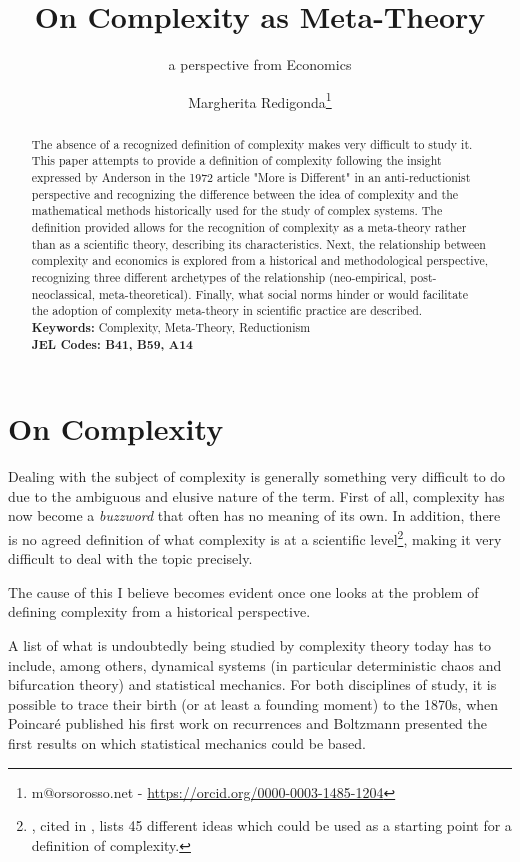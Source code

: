 \documentclass[a4paper, headings=standardclasses]{scrartcl}
\title{On Complexity as Meta-Theory\let\thefootnote\relax\footnotetext{
		Previous versions of this paper were presented at the 24\textsuperscript{th} ESHET Summer School and at the 2023 INEM Conference. \\
		The last available version, and an italian one, is online at \url{https://github.com/TnTo/complexity-economics/}.
}}
\subtitle{a perspective from Economics}
\author{Margherita Redigonda\thanks{m@orsorosso.net - \url{https://orcid.org/0000-0003-1485-1204}}}
\begin{document}
	
	\maketitle
	
	\begin{abstract}
		The absence of a recognized definition of complexity makes very difficult to study it.
		This paper attempts to provide a definition of complexity following the insight expressed by Anderson in the 1972 article "More is Different" in an anti-reductionist perspective and recognizing the difference between the idea of complexity and the mathematical methods historically used for the study of complex systems. 
		The definition provided allows for the recognition of complexity as a meta-theory rather than as a scientific theory, describing its characteristics.
		Next, the relationship between complexity and economics is explored from a historical and methodological perspective, recognizing three different archetypes of the relationship (neo-empirical, post-neoclassical, meta-theoretical).
		Finally, what social norms hinder or would facilitate the adoption of complexity meta-theory in scientific practice are described. \\
		\textbf{Keywords:} Complexity, Meta-Theory, Reductionism\\
		\textbf{JEL Codes: B41, B59, A14}
	\end{abstract}
	
\section{On Complexity}
Dealing with the subject of complexity is generally something very difficult to do due to the ambiguous and elusive nature of the term.
First of all, complexity has now become a \textit{buzzword} that often has no meaning of its own.
In addition, there is no agreed definition of what complexity is at a scientific level\footnote{\textcite{horgan2015}, cited in \textcite{holt2011}, lists 45 different ideas which could be used as a starting point for a definition of complexity.}, making it very difficult to deal with the topic precisely.

The cause of this I believe becomes evident once one looks at the problem of defining complexity from a historical perspective. 

A list of what is undoubtedly being studied by complexity theory today has to include, among others, dynamical systems (in particular deterministic chaos and bifurcation theory) and statistical mechanics. For both disciplines of study, it is possible to trace their birth (or at least a founding moment) to the 1870s, when Poincaré published his first work on recurrences and Boltzmann presented the first results on which statistical mechanics could be based.
\end{document}
